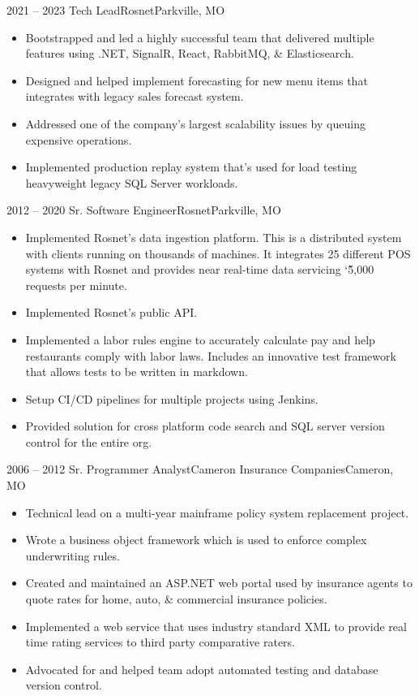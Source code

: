 \documentclass[11pt,letterpaper,final]{moderncv}
\begin{document}
	\cventry
{2021 -- 2023} {Tech Lead}{Rosnet}{Parkville, MO}{}{
		\begin{itemize}
			\item
				Bootstrapped and led a highly successful team that delivered
				multiple features using .NET, SignalR, React, RabbitMQ, \&
				Elasticsearch.
			\item
				Designed and helped implement forecasting for new menu
				items that integrates with legacy sales forecast system.
			\item
				Addressed one of the company's largest scalability issues by
				queuing expensive operations.
			\item
				Implemented production replay system that's used for load
				testing heavyweight legacy SQL Server workloads.
		\end{itemize}
}
\linebreak

	\cventry
{2012 -- 2020} {Sr. Software Engineer}{Rosnet}{Parkville, MO}{}{
		\begin{itemize}
			\item
				Implemented Rosnet's data ingestion platform. This is a
				distributed system with clients running on thousands of
				machines. It integrates 25 different POS systems with Rosnet and
				provides near real-time data servicing \char`\~5,000 requests
				per minute.
			\item
				Implemented Rosnet's public API. 
			\item
				Implemented a labor rules engine to accurately calculate
				pay and help restaurants comply with labor laws.
				Includes an innovative test framework that allows tests
				to be written in markdown.
			\item
				Setup CI/CD pipelines for multiple projects using Jenkins.
			\item
				Provided solution for cross platform code search and SQL server
				version control for the entire org.
		\end{itemize}
}
\linebreak

	\cventry
{2006 -- 2012} {Sr. Programmer Analyst}{Cameron Insurance Companies}{Cameron, MO}{}{
		\begin{itemize}
			\item 
				Technical lead on a multi-year mainframe policy system
				replacement project.
			\item 
				Wrote a business object framework which is used to enforce
				complex underwriting rules.
			\item 
				Created and maintained an ASP.NET web portal used by
				insurance agents to quote rates for home, auto, \&
				commercial insurance policies.
			\item 
				Implemented a web service that uses industry standard XML to
				provide real time rating services to third party comparative
				raters.
			\item
				Advocated for and helped team adopt automated testing
				and database version control.
		\end{itemize}
}
\linebreak
\end{document}
